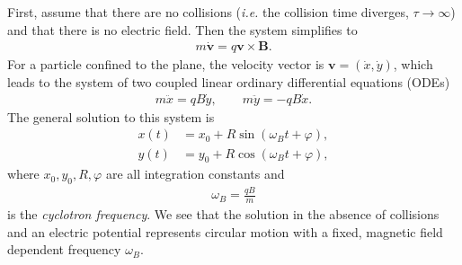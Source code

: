         \indent First, assume that there are no collisions (\textit{i.e.} the collision time diverges, $\tau \rightarrow\infty$) and that there is no electric field. Then the system simplifies to
        \begin{align}
            m\dot{\bm{v}} =q \bm{v}\times \bm{B}.
        \end{align}
        For a particle confined to the plane, the velocity vector is $\bm{v} = (\dot{x}, \dot{y})$, which leads to the system of two coupled linear ordinary differential equations (ODEs)
        \begin{align}
            m \ddot{x} = q B \dot{y}, \qquad m \ddot{y}= -q B \dot{x}.
        \end{align}
        The general solution to this system is
        \begin{align}
            x(t) &= x_0 + R \sin\left(\omega_Bt + \varphi \right), \\
            y(t) &= y_0 + R \cos\left(\omega_Bt + \varphi \right),
        \end{align}
        where $x_0, y_0, R, \varphi$ are all integration constants and
        \begin{align}
            \omega_B = \frac{q B}{m}
        \end{align}
        is the \textit{cyclotron frequency}.
        We see that the solution in the absence of collisions and an electric potential represents circular motion with a fixed, magnetic field dependent frequency $\omega_B$.

